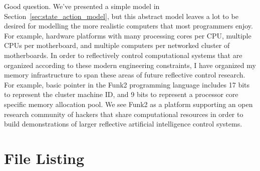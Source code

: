 Good question.  We've presented a simple model in
Section~\ref{sec:state_action_model}, but this abstract model leaves a
lot to be desired for modelling the more realistic computers that most
programmers enjoy.  For example, hardware platforms with many
processing cores per CPU, multiple CPUs per motherboard, and multiple
computers per networked cluster of motherboards.  In order to
reflectively control computational systems that are organized
according to these modern engineering constraints, I have organized my
memory infrastructure to span these areas of future reflective control
research.  For example, basic pointer in the Funk2 programming
language includes 17 bits to represent the cluster machine ID, and 9
bits to represent a processor core specific memory allocation pool.
We see Funk2 as a platform supporting an open research community of
hackers that share computational resources in order to build
demonstrations of larger reflective artificial intelligence control
systems.


\section{File Listing}


